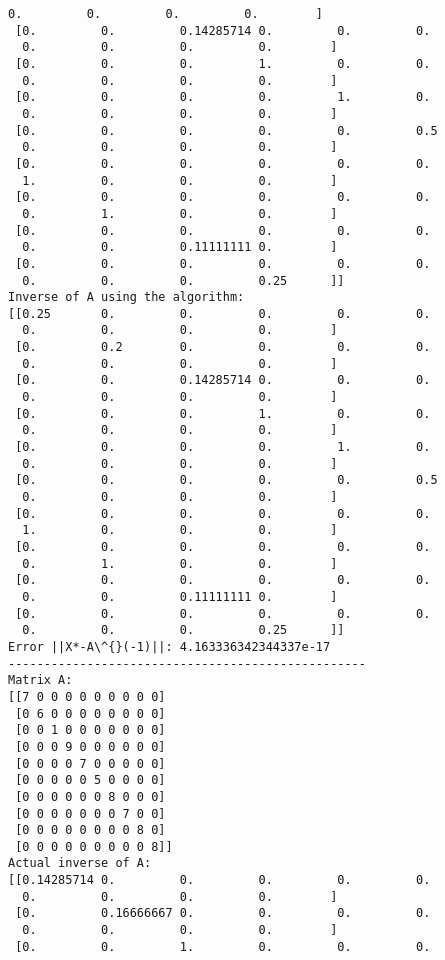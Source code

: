 \documentclass[11pt]{article}
\begin{document}
\begin{Verbatim}[commandchars=\\\{\}]
  0.         0.         0.         0.        ]
 [0.         0.         0.14285714 0.         0.         0.
  0.         0.         0.         0.        ]
 [0.         0.         0.         1.         0.         0.
  0.         0.         0.         0.        ]
 [0.         0.         0.         0.         1.         0.
  0.         0.         0.         0.        ]
 [0.         0.         0.         0.         0.         0.5
  0.         0.         0.         0.        ]
 [0.         0.         0.         0.         0.         0.
  1.         0.         0.         0.        ]
 [0.         0.         0.         0.         0.         0.
  0.         1.         0.         0.        ]
 [0.         0.         0.         0.         0.         0.
  0.         0.         0.11111111 0.        ]
 [0.         0.         0.         0.         0.         0.
  0.         0.         0.         0.25      ]]
Inverse of A using the algorithm:
[[0.25       0.         0.         0.         0.         0.
  0.         0.         0.         0.        ]
 [0.         0.2        0.         0.         0.         0.
  0.         0.         0.         0.        ]
 [0.         0.         0.14285714 0.         0.         0.
  0.         0.         0.         0.        ]
 [0.         0.         0.         1.         0.         0.
  0.         0.         0.         0.        ]
 [0.         0.         0.         0.         1.         0.
  0.         0.         0.         0.        ]
 [0.         0.         0.         0.         0.         0.5
  0.         0.         0.         0.        ]
 [0.         0.         0.         0.         0.         0.
  1.         0.         0.         0.        ]
 [0.         0.         0.         0.         0.         0.
  0.         1.         0.         0.        ]
 [0.         0.         0.         0.         0.         0.
  0.         0.         0.11111111 0.        ]
 [0.         0.         0.         0.         0.         0.
  0.         0.         0.         0.25      ]]
Error ||X*-A\^{}(-1)||: 4.163336342344337e-17
--------------------------------------------------
Matrix A:
[[7 0 0 0 0 0 0 0 0 0]
 [0 6 0 0 0 0 0 0 0 0]
 [0 0 1 0 0 0 0 0 0 0]
 [0 0 0 9 0 0 0 0 0 0]
 [0 0 0 0 7 0 0 0 0 0]
 [0 0 0 0 0 5 0 0 0 0]
 [0 0 0 0 0 0 8 0 0 0]
 [0 0 0 0 0 0 0 7 0 0]
 [0 0 0 0 0 0 0 0 8 0]
 [0 0 0 0 0 0 0 0 0 8]]
Actual inverse of A:
[[0.14285714 0.         0.         0.         0.         0.
  0.         0.         0.         0.        ]
 [0.         0.16666667 0.         0.         0.         0.
  0.         0.         0.         0.        ]
 [0.         0.         1.         0.         0.         0.

\end{Verbatim}
\end{document}
